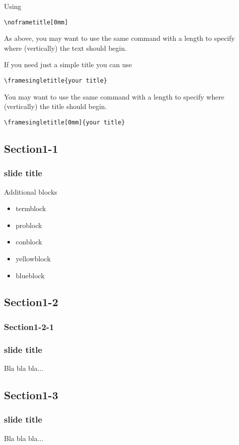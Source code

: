 \documentclass[slidestop,compress,9pt]{beamer}
\begin{document}
\begin{frame}[fragile]
\noframetitle[0mm]
Using 
\begin{lstlisting}
\noframetitle[0mm]
\end{lstlisting}

\vskip 10mm
As above, you may want to use the same command with a length to specify where (vertically) the text should begin.
\end{frame}

\begin{frame}[fragile]
If you need just a simple title you can use
\begin{lstlisting}
\framesingletitle{your title}
\end{lstlisting}

\vskip 10mm
You may want to use the same command with a length to specify where (vertically) the title should begin.
\begin{lstlisting}
\framesingletitle[0mm]{your title}
\end{lstlisting}
\end{frame}

\subsection{Section1-1}
\begin{frame}
\frametitle{slide title}
Additional blocks
\begin{itemize}
  \item termblock
  \item problock
  \item conblock
  \item yellowblock
  \item blueblock
\end{itemize}
\end{frame}

\subsection{Section1-2}
\subsubsection{Section1-2-1}
\begin{frame}
\frametitle{slide title}
Bla bla bla...
\end{frame}

\subsection{Section1-3}
\begin{frame}
\frametitle{slide title}
Bla bla bla...
\end{frame}
\end{document}
